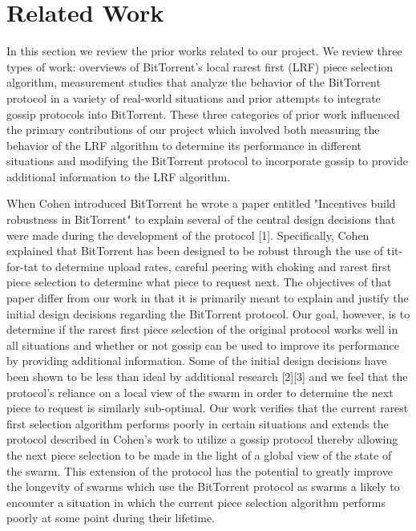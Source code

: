 \section{Related Work}

    In this section we review the prior works related to our project. We review three types of work: overviews of BitTorrent's local rarest first (LRF) piece selection algorithm, measurement studies that analyze the behavior of the BitTorrent protocol in a variety of real-world situations and prior attempts to integrate gossip protocols into BitTorrent. These three categories of prior work influenced the primary contributions of our project which involved both measuring the behavior of the LRF algorithm to determine its performance in different situations and modifying the BitTorrent protocol to incorporate gossip to provide additional information to the LRF algorithm. 

    When Cohen introduced BitTorrent he wrote a paper entitled "Incentives build robustness in BitTorrent" to explain several of the central design decisions that were made during the development of the protocol [1]. Specifically, Cohen explained that BitTorrent has been designed to be robust through the use of tit-for-tat to determine upload rates,  careful peering with choking and rarest first piece selection to determine what piece to request next. The objectives of that paper differ from our work in that it is primarily meant to explain and justify the initial design decisions regarding the BitTorrent protocol. Our goal, however,  is to determine if the rarest first piece selection of the original protocol works well in all situations and whether or not gossip can be used to improve its performance by providing additional information. Some of the initial design decisions have been shown to be less than ideal by additional research [2][3] and  we feel that the protocol's reliance on a local view of the swarm in order to determine the next piece to request is similarly sub-optimal. Our work verifies that the current rarest first selection algorithm performs poorly in certain situations and extends the protocol described in Cohen's work to utilize a gossip protocol thereby allowing the next piece selection to be made in the light of a global view of the state of the swarm. This extension of the protocol has the potential to greatly improve the longevity of swarms which use the BitTorrent protocol as swarms a likely to encounter a situation in which the current piece selection algorithm performs poorly at some point during their lifetime.

